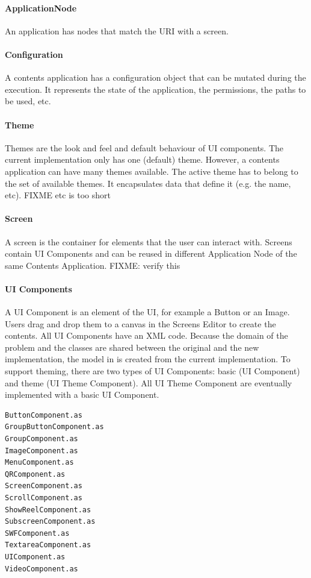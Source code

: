 \paragraph{ApplicationNode} An application has nodes that match the \ac{URI} with a screen.

\paragraph{Configuration} A contents application has a configuration object that can be mutated during the execution.
It represents the state of the application, the permissions, the paths to be used, etc.

\paragraph{Theme} Themes are the look and feel and default behaviour of \ac{UI} components.
The current implementation only has one (default) theme.
However, a contents application can have many themes available.
The active theme has to belong to the set of available themes. 
It encapsulates data that define it (e.g. the name, etc). FIXME etc is too short

\paragraph{Screen} A screen is the container for elements that the user can interact with.
Screens contain \ac{UI} Components and can be reused in different Application Node of the same Contents Application. FIXME: verify this

\paragraph{UI Components} A UI Component is an element of the \ac{UI}, for example a Button or an Image.
Users drag and drop them to a canvas in the Screens Editor to create the contents. 
All UI Components have an \ac{XML} code.
Because the domain of the problem and the classes are shared between the original and the new implementation, the model in  is created from the current implementation.
To support theming, there are two types of UI Components: basic (UI Component) and theme (UI Theme Component).
All UI Theme Component are eventually implemented with a basic UI Component.

\begin{lstlisting}[caption=Basic UI Components, label=uicomponents-list]
ButtonComponent.as
GroupButtonComponent.as
GroupComponent.as
ImageComponent.as
MenuComponent.as
QRComponent.as
ScreenComponent.as
ScrollComponent.as
ShowReelComponent.as
SubscreenComponent.as
SWFComponent.as
TextareaComponent.as
UIComponent.as
VideoComponent.as
\end{lstlisting}

